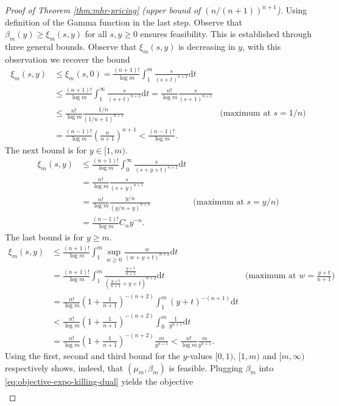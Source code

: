 \documentclass[11pt]{article}
\newcommand{\dd}{\mathrm{d}}
\begin{document}
\begin{proof}[Proof of Theorem \ref{thm:mhr-pricing} (upper bound of $(n/(n+1))^{n+1}$)]
    Using definition of the Gamma function in the last step.
    Observe that $\beta_m(y)\ge \xi_m(s,y)$ for all $s, y\ge0$ ensures feasibility. This is established through three general bounds. 
    Observe that $\xi_m(s,y)$ is decreasing in $y$, with this observation we recover the bound
    \begin{align*}
        \xi_m(s,y)&\le\xi_m(s,0)=\frac{(n+1)!}{\log m}\int_1^m\frac{s}{(s+t)^{n+2}}\dd t\\
        &\le \frac{(n+1)!}{\log m}\int_1^\infty\frac{s}{(s+t)^{n+2}}\dd t=\frac{n!}{\log m}\frac{s}{(s+1)^{n+1}}\\
        &\le \frac{n!}{\log m}\frac{1/n}{(1/n+1)^{n+1}}&\text{(maximum at }s=1/n\text{)}\\
        &= \frac{(n-1)!}{\log m}\left(\frac{n}{n+1}\right)^{n+1}<\frac{(n-1)!}{\log m}.
    \end{align*}
    The next bound is for $y\in[1,m)$.
    \begin{align*}
        \xi_m(s,y)&\le \frac{(n+1)!}{\log m}\int_0^\infty\frac{s}{(s+y+t)^{n+2}}\dd t\\
        &=\frac{n!}{\log m}\frac{s}{(s+y)^{n+1}}\\
        &=\frac{n!}{\log m}\frac{y/n}{(y/n+y)^{n+1}}&\text{(maximum at }s=y/n\text{)}\\
        &=\frac{(n-1)!}{\log m}C_ny^{-n}.
    \end{align*}
    The last bound is for $y\ge m$.
    \begin{align*}
        \xi_m(s,y)&\le \frac{(n+1)!}{\log m}\int_1^m\sup_{w\ge0}\frac{w}{(w+y+t)^{n+2}}\dd t\\
        &=\frac{(n+1)!}{\log m}\int_1^m\frac{\frac{y+t }{n+1}}{(\frac{y+t }{n+1}+y+t)^{n+2}}\dd t&\text{(maximum at }w=\frac{y+t }{n+1}\text{)}\\
        &=\frac{n!}{\log m}\left(1+\frac{1}{n+1}\right)^{-(n+2)}\int_1^m(y+t)^{-(n+1)}\dd t\\
        &<\frac{n!}{\log m}\left(1+\frac{1}{n+1}\right)^{-(n+2)}\int_0^m\frac{1}{y^{n+1}}\dd t\\
        &=\frac{n!}{\log m}\left(1+\frac{1}{n+1}\right)^{-(n+2)}\frac{m}{y^{n+1}}<\frac{n!}{\log m}\frac{m}{y^{n+1}}.
    \end{align*}
    Using the first, second and third bound for the $y$-values $[0,1)$, $[1,m)$ and $[m,\infty)$
    respectively shows, indeed, that $(\mu_m,\beta_m)$ is feasible. Plugging $\beta_m$ into \eqref{eq:objective-expo-killing-dual} yields the objective
    \begin{align*}

\end{align*}
\end{proof}
\end{document}

